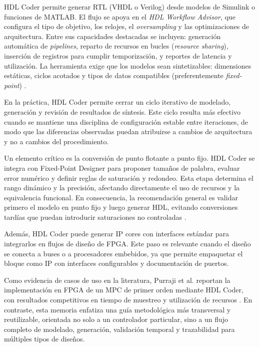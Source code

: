HDL Coder permite generar RTL (VHDL o Verilog) desde modelos de Simulink o funciones de MATLAB. El flujo se apoya en el \textit{HDL Workflow Advisor}, que configura el tipo de objetivo, los relojes, el \textit{oversampling} y las optimizaciones de arquitectura. Entre sus capacidades destacadas se incluyen: generación automática de \textit{pipelines}, reparto de recursos en bucles (\textit{resource sharing}), inserción de registros para cumplir temporización, y reportes de latencia y utilización. La herramienta exige que los modelos sean sintetizables: dimensiones estáticas, ciclos acotados y tipos de datos compatibles (preferentemente \textit{fixed-point}) \cite{matlabHDLCoder}.

En la práctica, HDL Coder permite cerrar un ciclo iterativo de modelado, generación y revisión de resultados de síntesis. Este ciclo resulta más efectivo cuando se mantiene una disciplina de configuración estable entre iteraciones, de modo que las diferencias observadas puedan atribuirse a cambios de arquitectura y no a cambios del procedimiento.

Un elemento crítico es la conversión de punto flotante a punto fijo. HDL Coder se integra con Fixed-Point Designer para proponer tamaños de palabra, evaluar error numérico y definir reglas de saturación y redondeo. Esta etapa determina el rango dinámico y la precisión, afectando directamente el uso de recursos y la equivalencia funcional. En consecuencia, la recomendación general es validar primero el modelo en punto fijo y luego generar HDL, evitando conversiones tardías que puedan introducir saturaciones no controladas \cite{fixedPointDesigner}.

Además, HDL Coder puede generar IP cores con interfaces estándar para integrarlos en flujos de diseño de FPGA. Este paso es relevante cuando el diseño se conecta a buses o a procesadores embebidos, ya que permite empaquetar el bloque como IP con interfaces configurables y documentación de puertos.

Como evidencia de casos de uso en la literatura, Purraji et al. reportan la implementación en FPGA de un MPC de primer orden mediante HDL Coder, con resultados competitivos en tiempo de muestreo y utilización de recursos \cite{purraji2025mpc_hdlcoder}. En contraste, esta memoria enfatiza una guía metodológica más transversal y reutilizable, orientada no solo a un controlador particular, sino a un flujo completo de modelado, generación, validación temporal y trazabilidad para múltiples tipos de diseños.

